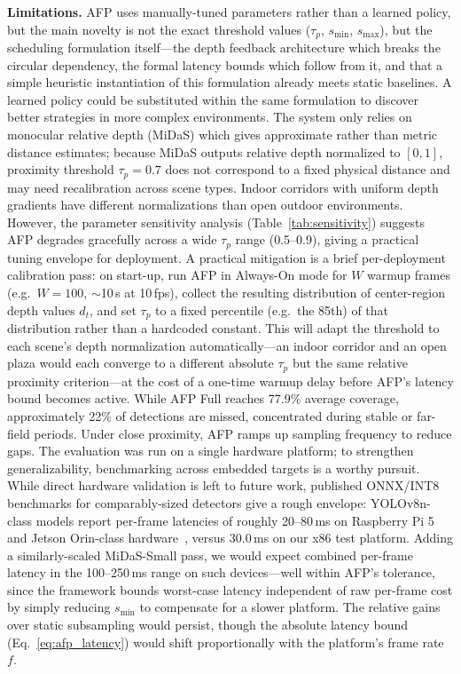 \documentclass[conference]{IEEEtran}
\begin{document}
\textbf{Limitations.} AFP uses manually-tuned parameters rather than a
learned policy, but the main novelty is not the exact threshold
values ($\tau_p$, $s_\text{min}$, $s_\text{max}$), but the scheduling
formulation itself---the depth feedback architecture which breaks
the circular dependency, the formal latency bounds which follow from
it, and that a simple heuristic instantiation of this formulation
already meets static baselines. A learned policy could be substituted
within the same formulation to discover better strategies in more
complex environments. The system only relies on monocular relative
depth (MiDaS) which gives approximate rather than metric distance
estimates; because MiDaS outputs relative depth normalized to $[0,1]$,
proximity threshold $\tau_p = 0.7$ does not correspond to a fixed
physical distance and may need recalibration across scene types.
Indoor corridors with uniform depth gradients have different
normalizations than open outdoor environments. However, the parameter
sensitivity analysis (Table~\ref{tab:sensitivity}) suggests AFP
degrades gracefully across a wide $\tau_p$ range (0.5--0.9), giving a
practical tuning envelope for deployment. A practical mitigation is a
brief per-deployment calibration pass: on start-up, run AFP in
Always-On mode for $W$ warmup frames (e.g.\ $W{=}100$, $\sim$10\,s at
10\,fps), collect the resulting distribution of center-region depth
values $d_t$, and set $\tau_p$ to a fixed percentile (e.g.\ the 85th)
of that distribution rather than a hardcoded constant. This will
adapt the threshold to each scene's depth normalization
automatically---an indoor corridor and an open plaza would each
converge to a different absolute $\tau_p$ but the same relative
proximity criterion---at the cost of a one-time warmup delay before
AFP's latency bound becomes active. While AFP Full reaches 77.9\%
average coverage, approximately 22\% of detections are missed,
concentrated during stable or far-field periods. Under close
proximity, AFP ramps up sampling frequency to reduce gaps. The
evaluation was run on a single hardware platform; to strengthen
generalizability, benchmarking across embedded targets is a worthy
pursuit. While direct hardware validation is left to future work,
published ONNX/INT8 benchmarks for comparably-sized detectors give a
rough envelope: YOLOv8n-class models report per-frame latencies of
roughly 20--80\,ms on Raspberry Pi 5 and Jetson Orin-class hardware~\cite{pi5adas2026,jetsonyolo2025}, versus 30.0\,ms on our x86 test platform. Adding a
similarly-scaled MiDaS-Small pass, we would expect combined per-frame
latency in the 100--250\,ms range on such devices---well within AFP's
tolerance, since the framework bounds worst-case latency independent
of raw per-frame cost by simply reducing $s_\text{min}$ to compensate
for a slower platform. The relative gains over static subsampling
would persist, though the absolute latency bound
(Eq.~\ref{eq:afp_latency}) would shift proportionally with the
platform's frame rate $f$.
\end{document}
